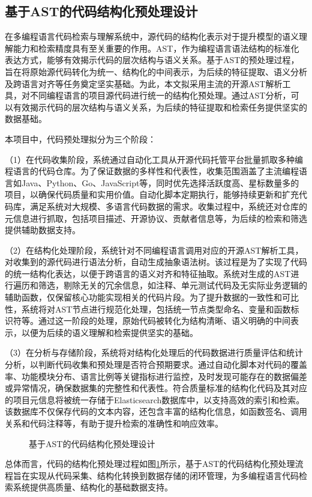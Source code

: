 \documentclass[UTF8,a4paper,12pt]{ctexart}
\numberwithin{equation}{section}
\begin{document}
\subsection{基于AST的代码结构化预处理设计}
在多编程语言代码检索与理解系统中，源代码的结构化表示对于提升模型的语义理解能力和检索精度具有至关重要的作用。AST，作为编程语言语法结构的标准化表达方式，能够有效揭示代码的层次结构与语义关系。基于AST的预处理过程，旨在将原始源代码转化为统一、结构化的中间表示，为后续的特征提取、语义分析及跨语言对齐等任务奠定坚实基础。为此，本文拟采用主流的开源AST解析工具，对不同编程语言的项目源代码进行统一的结构化预处理。通过AST分析，可以有效揭示代码的层次结构与语义关系，为后续的特征提取和检索任务提供坚实的数据基础。\par
本项目中，代码预处理拟分为三个阶段：\par
（1）在代码收集阶段，系统通过自动化工具从开源代码托管平台批量抓取多种编程语言的代码仓库。为了保证数据的多样性和代表性，收集范围涵盖了主流编程语言如Java、Python、Go、JavaScript等，同时优先选择活跃度高、星标数量多的项目，以确保代码质量和实用价值。自动化脚本定期执行，能够持续更新和扩充代码库，满足系统对大规模、多语言代码数据的需求。收集过程中，系统还对仓库的元信息进行抓取，包括项目描述、开源协议、贡献者信息等，为后续的检索和筛选提供辅助数据支持。\par
（2）在结构化处理阶段，系统针对不同编程语言调用对应的开源AST解析工具，对收集到的源代码进行语法分析，自动生成抽象语法树。该过程是为了实现了代码的统一结构化表达，以便于跨语言的语义对齐和特征抽取。系统对生成的AST进行遍历和筛选，剔除无关的冗余信息，如注释、单元测试代码及无实际业务逻辑的辅助函数，仅保留核心功能实现相关的代码片段。为了提升数据的一致性和可比性，系统将对AST节点进行规范化处理，包括统一节点类型命名、变量和函数标识符等。通过这一阶段的处理，原始代码被转化为结构清晰、语义明确的中间表示，以便为后续的语义理解和检索提供坚实的基础。\par
（3）在分析与存储阶段，系统将对结构化处理后的代码数据进行质量评估和统计分析，以判断代码收集和预处理是否符合预期要求。通过自动化脚本对代码的覆盖率、功能模块分布、语言比例等关键指标进行监控，及时发现可能存在的数据偏差或异常情况，确保数据集的完整性和代表性。符合质量标准的结构化代码及其对应的项目元信息将被统一存储于Elasticsearch数据库中，以支持高效的索引和检索。该数据库不仅保存代码的文本内容，还包含丰富的结构化信息，如函数签名、调用关系和代码注释等，有助于提升检索的准确性和响应效率。\par
\begin{figure}[H]
	\caption{基于AST的代码结构化预处理设计}
	\label{pre_pro}
\end{figure}
总体而言，代码的结构化预处理过程如图\ref{pre_pro}所示，基于AST的代码结构化预处理流程旨在实现从代码采集、结构化转换到数据存储的闭环管理，为多编程语言代码检索系统提供高质量、结构化的基础数据支持。\par
\end{document}
